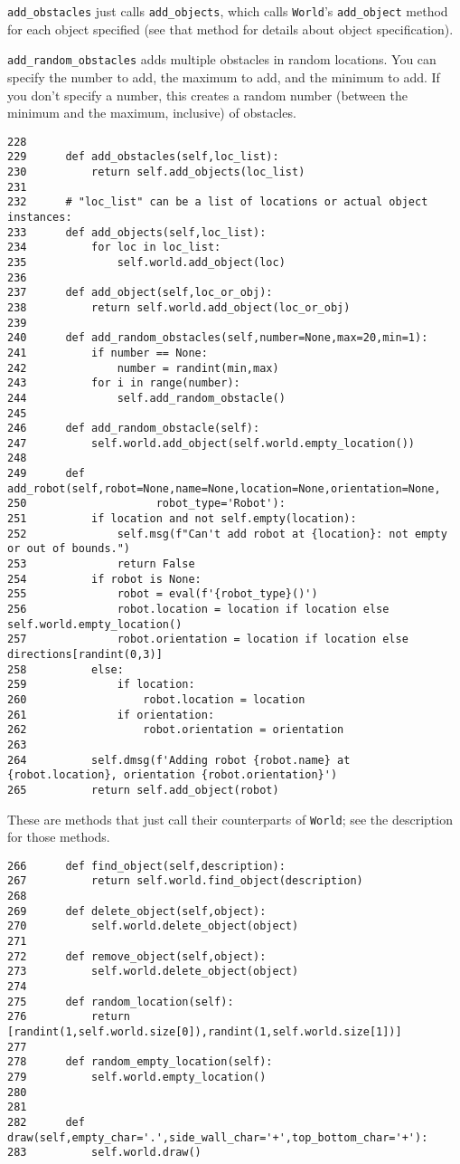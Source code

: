 \documentclass[11pt]{tufte-handout}
\begin{document}
\texttt{add\_obstacles} just calls \texttt{add\_objects}, which calls \texttt{World}'s \texttt{add\_object} method for each object specified (see that method for details about object specification).  

\texttt{add\_random\_obstacles} adds multiple obstacles in random locations.  You can specify the number to add, the maximum to add, and the minimum to add.  If you don't specify a number, this creates a random number (between the minimum and the maximum, inclusive) of obstacles.

\begin{verbatim}
228  
229      def add_obstacles(self,loc_list):
230          return self.add_objects(loc_list)
231  
232      # "loc_list" can be a list of locations or actual object instances:
233      def add_objects(self,loc_list):
234          for loc in loc_list:
235              self.world.add_object(loc)
236  
237      def add_object(self,loc_or_obj):
238          return self.world.add_object(loc_or_obj)
239  
240      def add_random_obstacles(self,number=None,max=20,min=1):
241          if number == None:
242              number = randint(min,max)
243          for i in range(number):
244              self.add_random_obstacle()
245  
246      def add_random_obstacle(self):
247          self.world.add_object(self.world.empty_location())
248  
249      def add_robot(self,robot=None,name=None,location=None,orientation=None,
250                    robot_type='Robot'):
251          if location and not self.empty(location):
252              self.msg(f"Can't add robot at {location}: not empty or out of bounds.")
253              return False
254          if robot is None:
255              robot = eval(f'{robot_type}()')
256              robot.location = location if location else self.world.empty_location()
257              robot.orientation = location if location else directions[randint(0,3)]
258          else:
259              if location:
260                  robot.location = location
261              if orientation:
262                  robot.orientation = orientation
263  
264          self.dmsg(f'Adding robot {robot.name} at {robot.location}, orientation {robot.orientation}')
265          return self.add_object(robot)
\end{verbatim}

These are methods that just call their counterparts of \texttt{World}; see the description for those methods.

\begin{verbatim}
266      def find_object(self,description):
267          return self.world.find_object(description)
268  
269      def delete_object(self,object):
270          self.world.delete_object(object)
271  
272      def remove_object(self,object):
273          self.world.delete_object(object)
274  
275      def random_location(self):
276          return [randint(1,self.world.size[0]),randint(1,self.world.size[1])]
277  
278      def random_empty_location(self):
279          self.world.empty_location()
280  
281  
282      def draw(self,empty_char='.',side_wall_char='+',top_bottom_char='+'):
283          self.world.draw()
\end{verbatim}
\end{document}
